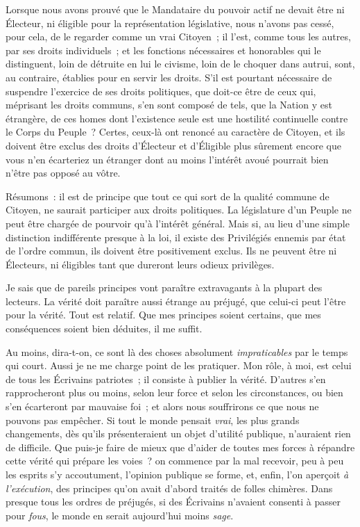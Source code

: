 \documentclass[french,twoside]{book} %
\begin{document}
Lorsque nous avons prouvé que le Mandataire du pouvoir actif ne devait être ni Électeur, ni éligible pour la représentation législative, nous n’avons pas cessé, pour cela, de le regarder comme un vrai Citoyen ; il l’est, comme tous les autres, par ses droits individuels ; et les fonctions nécessaires et honorables qui le distinguent, loin de détruite en lui le civisme, loin de le choquer dans autrui, sont, au contraire, établies pour en servir les droits. S’il est pourtant nécessaire de suspendre l’exercice de ses droits politiques, que doit-ce être de ceux qui, méprisant les droits communs, s’en sont composé de tels, que la Nation y est étrangère, de ces homes dont l’existence seule est une hostilité continuelle contre le Corps du Peuple ? Certes, ceux-là ont renoncé au caractère de Citoyen, et ils doivent être exclus des droits d’Électeur et d’Éligible plus sûrement encore que vous n’en écarteriez un étranger dont au moins l’intérêt avoué pourrait bien n’être pas opposé au vôtre.\par
Résumons : il est de principe que tout ce qui sort de la qualité commune de Citoyen, ne saurait participer aux droits politiques. La législature d’un Peuple ne peut être chargée de pourvoir qu’à l’intérêt général. Mais si, au lieu d’une simple distinction indifférente presque à la loi, il existe des Privilégiés ennemis par état de l’ordre commun, ils doivent être positivement exclus. Ils ne peuvent être ni Électeurs, ni éligibles tant que dureront leurs odieux privilèges.\par
Je sais que de pareils principes vont paraître extravagants à la plupart des lecteurs. La vérité doit paraître aussi étrange au préjugé, que celui-ci peut l’être pour la vérité. Tout est relatif. Que mes principes soient certains, que mes conséquences soient bien déduites, il me suffit.\par
Au moins, dira-t-on, ce sont là des choses absolument {\itshape impraticables} par le temps qui court. Aussi je ne me charge point de les pratiquer. Mon rôle, à moi, est celui de tous les Écrivains patriotes ; il consiste à publier la vérité. D’autres s’en rapprocheront plus ou moins, selon leur force et selon les circonstances, ou bien s’en écarteront par mauvaise foi ; et alors nous souffrirons ce que nous ne pouvons pas empêcher. Si tout le monde pensait {\itshape vrai}, les plus grands changements, dès qu’ils présenteraient un objet d’utilité publique, n’auraient rien de difficile. Que puis-je faire de mieux que d’aider de toutes mes forces à répandre cette vérité qui prépare les voies ? on commence par la mal recevoir, peu à peu les esprits s’y accoutument, l’opinion publique se forme, et, enfin, l’on aperçoit {\itshape à l’exécution}, des principes qu’on avait d’abord traités de folles chimères. Dans presque tous les ordres de préjugés, si des Écrivains n’avaient consenti à passer pour {\itshape fous}, le monde en serait aujourd’hui moins {\itshape sage}.\par
\end{document}
